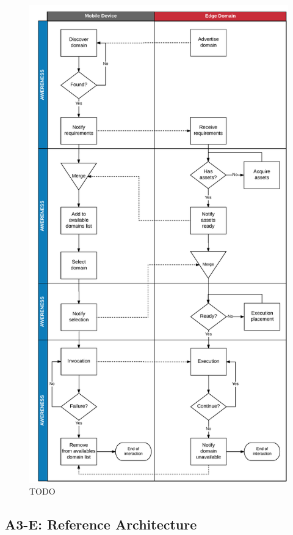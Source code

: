 \begin{figure}
  \includegraphics[height=\textheight]{figs/activities.png}
  \caption{TODO}
  \label{fig:activities}
\end{figure}

\subsection{A3-E: Reference Architecture}

